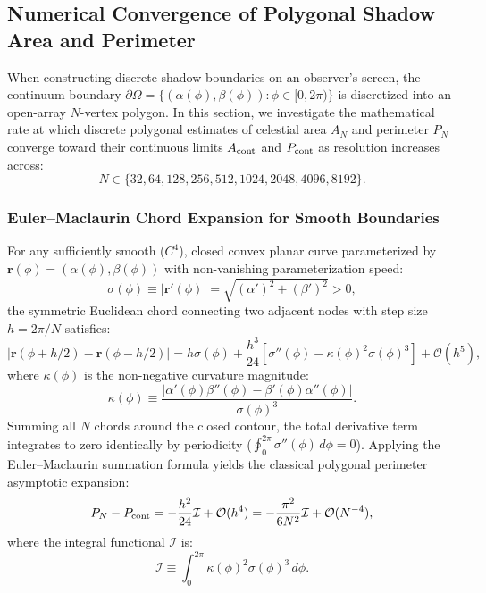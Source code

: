 \subsection{Numerical Convergence of Polygonal Shadow Area and Perimeter}
\label{subsec:polygonal_convergence}

When constructing discrete shadow boundaries on an observer's screen, the continuum boundary $\partial\Omega = \{(\alpha(\phi), \beta(\phi)) : \phi \in [0, 2\pi)\}$ is discretized into an open-array $N$-vertex polygon. In this section, we investigate the mathematical rate at which discrete polygonal estimates of celestial area $A_N$ and perimeter $P_N$ converge toward their continuous limits $A_{\rm cont}$ and $P_{\rm cont}$ as resolution increases across:
\begin{equation}
    N \in \{32, 64, 128, 256, 512, 1024, 2048, 4096, 8192\}.
    \label{eq:n_sequence}
\end{equation}

\subsubsection{Euler--Maclaurin Chord Expansion for Smooth Boundaries}
For any sufficiently smooth ($C^4$), closed convex planar curve parameterized by $\mathbf{r}(\phi) = (\alpha(\phi), \beta(\phi))$ with non-vanishing parameterization speed:
\begin{equation}
    \sigma(\phi) \equiv |\mathbf{r}'(\phi)| = \sqrt{(\alpha')^2 + (\beta')^2} > 0,
    \label{eq:speed_sigma_def}
\end{equation}
the symmetric Euclidean chord connecting two adjacent nodes with step size $h = 2\pi/N$ satisfies:
\begin{equation}
    |\mathbf{r}(\phi + h/2) - \mathbf{r}(\phi - h/2)| = h\sigma(\phi) + \frac{h^3}{24}\left[\sigma''(\phi) - \kappa(\phi)^2\sigma(\phi)^3\right] + \mathcal{O}(h^5),
    \label{eq:chord_expansion_local}
\end{equation}
where $\kappa(\phi)$ is the non-negative curvature magnitude:
\begin{equation}
    \kappa(\phi) \equiv \frac{|\alpha'(\phi)\beta''(\phi) - \beta'(\phi)\alpha''(\phi)|}{\sigma(\phi)^3}.
    \label{eq:curvature_magnitude_def}
\end{equation}
Summing all $N$ chords around the closed contour, the total derivative term integrates to zero identically by periodicity ($\oint_0^{2\pi} \sigma''(\phi)\,d\phi = 0$). Applying the Euler--Maclaurin summation formula yields the classical polygonal perimeter asymptotic expansion:
\begin{equation}
    P_N - P_{\rm cont} = -\frac{h^2}{24}\mathcal{I} + \mathcal{O}(h^4) = -\frac{\pi^2}{6N^2}\mathcal{I} + \mathcal{O}(N^{-4}),
    \label{eq:perimeter_chord_asymptotic}
\end{equation}
where the integral functional $\mathcal{I}$ is:
\begin{equation}
    \mathcal{I} \equiv \int_0^{2\pi} \kappa(\phi)^2 \sigma(\phi)^3 \, d\phi.
    \label{eq:curvature_functional_I}
\end{equation}

